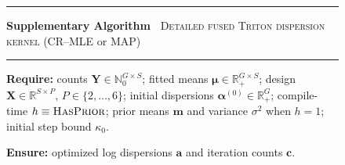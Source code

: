 
\begingroup
{}
\setcounter{tritonline}{0}
\newcommand{\tritonLine}[2][0em]{%
  \stepcounter{tritonline}%
  \noindent
  \makebox[2.1em][r]{\arabic{tritonline}:}%
  \hspace{0.7em}\hspace*{#1}%
  \begin{minipage}[t]{\dimexpr\linewidth-3.2em-#1\relax}%
    #2
  \end{minipage}\par
}

\begin{figure}[htbp]
\small
\setlength{\fboxsep}{0pt}
\noindent\rule{\linewidth}{0.8pt}\par
\vspace{2pt}
\noindent
{}\label{alg:triton-detail}%
\textbf{Supplementary Algorithm~\thesupalg}\quad
\textsc{Detailed fused Triton dispersion kernel} (CR--MLE or MAP)
\par
\vspace{2pt}
\noindent\rule{\linewidth}{0.4pt}\par
\vspace{4pt}

\noindent
\textbf{Require:}\;
counts $\mathbf{Y}\in\mathbb{N}_0^{G\times S}$;
fitted means $\boldsymbol{\mu}\in\mathbb{R}_{+}^{G\times S}$;
design $\mathbf{X}\in\mathbb{R}^{S\times P}$, $P\in\{2,\dots,6\}$;
initial dispersions $\boldsymbol{\alpha}^{(0)}\in\mathbb{R}_{+}^{G}$;
compile-time $h\equiv\textsc{HasPrior}$; prior means $\mathbf{m}$ and variance
$\sigma^2$ when $h=1$; initial step bound $\kappa_0$.
\par
\noindent
\textbf{Ensure:}\;
optimized log dispersions $\mathbf{a}$ and iteration counts $\mathbf{c}$.
\par
\vspace{4pt}


\end{figure}

